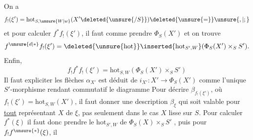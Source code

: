 On a
\[
 f_!(\xi')=\mathrm{hot}_{S,\unsure{W|w}}(X'\deleted{\unsure{/S}})\deleted{\unsure{=}}\unsure{,|;}
\]
et pour calculer $f^*f_!(\xi')$, il faut comme  prendre $\Phi_S(X')$ et on trouve
\[
 f^{\unsure{d|*}}f_!(\xi')=\deleted{\unsure{\mathrm{hot}}}\inserted{\mathrm{hot}_{S',W}}(\Phi_S(X')\times_S S').
\]
Enfin,
\[
 f_!f^*f_!(\xi')=\mathrm{hot}_{S,W}(\Phi_S(X')\times_S S')
\]
Il faut expliciter les flèches
$\alpha_{X'}$ est déduit de $i_{X'}:X'\longrightarrow\Phi_S(X')$ comme l'unique $S'$-morphisme rendant commutatif le diagramme
Pour décrire $\beta_{f_!(\xi')}$, où $f_!(\xi')=\mathrm{hot}_{S,W}(X')$, il faut donner une description   $\beta_\xi$ qui soit valable pour \uline{tout} représentant $X$ de $\xi$, pas seulement dans le cas $X$ lisse sur $S$.  Pour calculer $f^*(\xi)$ il faut donc prendre le $\mathrm{hot}_{S',W}$ de $\Phi_S(X)\times_S S'$ , puis pour $f_!f^{\unsure{*}}(\xi)$, il
